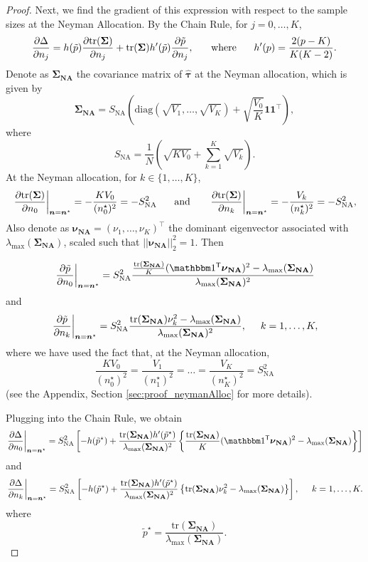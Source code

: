 \documentclass{article}
\newcommand{\bsSigmaN}{\boldsymbol {\Sigma_{\textbf{NA}}}}
\newcommand{\hbstau}{\boldsymbol{\hat \tau}}
\newcommand{\bsSig}{\boldsymbol  \Sigma}
\newcommand{\bsnu}{\boldsymbol \nu_{\textbf{NA}}}
\newcommand{\bsn}{\boldsymbol n}
\newcommand{\Tr}{\text{tr}}
\newcommand{\tran}{\mathsf{T}}
\newcommand{\lambdamaxn}{\lambda_{\text{max}}(\bsSigmaN)}
\newcommand{\sna}{S_{\text{NA}}}
\begin{document}
\begin{proof}
Next, we find the gradient of this expression with respect to the sample sizes at the Neyman Allocation. By the Chain Rule, for $j = 0, \dots, K$,
\[ \frac{\partial\Delta}{\partial n_j}=h(\tilde p)\frac{\partial\Tr(\bsSig)}{\partial n_j}+\Tr(\bsSig)h'(\tilde p)\frac{\partial\tilde p}{\partial n_j}, \hspace{5mm} \text{ where } \hspace{5mm} h'(p)=\frac{2(p-K)}{K(K-2)}. \]
Denote as $\bsSigmaN$ the covariance matrix of $\hbstau$ at the Neyman allocation, which is given by 
\begin{equation}\label{eq:sigmaneyman}
\bsSigmaN = \sna \left( \text{diag}\left( \sqrt{V_1}, \dots, \sqrt{V_K} \right) + \sqrt{\frac{V_0}{K}} \boldsymbol{1} \boldsymbol{1}^\top\right), 
\end{equation}
where
\[ \sna = \frac{1}{N} \left( \sqrt{K V_0} + \sum_{k = 1}^K \sqrt{V_k} \right).\] 
At the Neyman allocation, for $k \in \{1, \dots, K\}$, 
\[ \left.\frac{\partial\Tr(\bsSig)}{\partial n_0}\right|_{\bsn=\bsn^\star}=-\frac{KV_0}{(n_0^\star)^2}=-\sna^2 \hspace{5mm} \text{ and } \hspace{5mm} \left.\frac{\partial\Tr(\bsSig)}{\partial n_k}\right|_{\bsn=\bsn^\star}=-\frac{V_k}{(n_k^\star)^2}=-\sna^2, \]
Also denote as $\bsnu = (\nu_1, \dots, \nu_K)^\top$ the dominant eigenvector associated with $\lambdamaxn$, scaled such that $||\bsnu||_2^2 = 1$. Then

\[ \left.\frac{\partial\tilde p}{\partial n_0}\right|_{\bsn=\bsn^\star}=\sna^2\frac{\frac{\Tr(\bsSigmaN)}{K}(\mathbbm 1^\tran\bsnu)^2-\lambdamaxn}{\lambdamaxn^2} \]
and
\[ \left.\frac{\partial\tilde p}{\partial n_k}\right|_{\bsn=\bsn^\star}=\sna^2\frac{\Tr(\bsSigmaN)\nu_k^2-\lambdamaxn}{\lambdamaxn^2}, \hspace{5mm} k=1,\dots,K, \]
where we have used the fact that, at the Neyman allocation, 
\[ \frac{K V_0}{(n_0^\star)^2} = \frac{V_1}{(n_1^\star)^2} = \dots = \frac{V_K}{(n_K^\star)^2} = \sna^2\]
(see the Appendix, Section \ref{sec:proof_neymanAlloc} for more details).

Plugging into the Chain Rule, we obtain
\[ \left.\frac{\partial\Delta}{\partial n_0}\right|_{\bsn=\bsn^\star}=\sna^2\left[-h(\tilde p^\star)+\frac{\Tr(\bsSigmaN)h'(\tilde p^\star)}{\lambdamaxn^2}\left\{\frac{\Tr(\bsSigmaN)}{K}(\mathbbm 1^\tran\bsnu)^2-\lambdamaxn\right\}\right] \]
and
\[ \left.\frac{\partial\Delta}{\partial n_k}\right|_{\bsn=\bsn^\star}=\sna^2\left[-h(\tilde p^\star)+\frac{\Tr(\bsSigmaN)h'(\tilde p^\star)}{\lambdamaxn^2}\left\{\Tr(\bsSigmaN)\nu_k^2-\lambdamaxn\right\}\right], \hspace{5mm} k=1,\dots,K. \]
where
\[ \tilde p^\star=\frac{\Tr(\bsSigmaN)}{\lambdamaxn}. \]


\end{proof}
\end{document}

